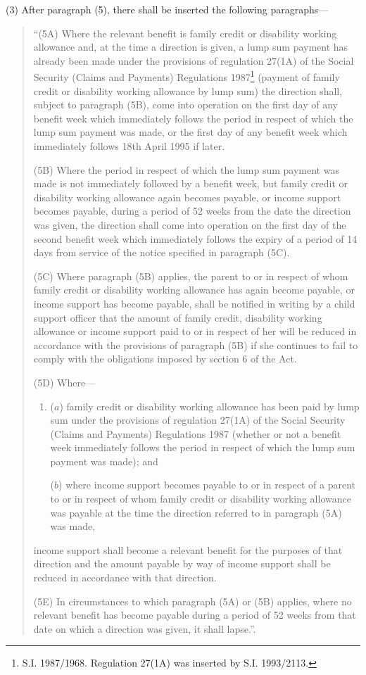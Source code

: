 \documentclass[a4paper]{article}
\begin{document}
(3) After paragraph (5), there shall be inserted the following paragraphs—
\begin{quotation}
“(5A) Where the relevant benefit is family credit or disability working allowance and, at the time a direction is given, a lump sum payment has already been made under the provisions of regulation 27(1A) of the Social Security (Claims and Payments) Regulations 1987\footnote{\frenchspacing S.I. 1987/1968. Regulation 27(1A) was inserted by S.I. 1993/2113.} (payment of family credit or disability working allowance by lump sum) the direction shall, subject to paragraph (5B), come into operation on the first day of any benefit week which immediately follows the period in respect of which the lump sum payment was made, or the first day of any benefit week which immediately follows 18th April 1995 if later.

(5B) Where the period in respect of which the lump sum payment was made is not immediately followed by a benefit week, but family credit or disability working allowance again becomes payable, or income support becomes payable, during a period of 52 weeks from the date the direction was given, the direction shall come into operation on the first day of the second benefit week which immediately follows the expiry of a period of 14 days from service of the notice specified in paragraph (5C).

(5C) Where paragraph (5B) applies, the parent to or in respect of whom family credit or disability working allowance has again become payable, or income support has become payable, shall be notified in writing by a child support officer that the amount of family credit, disability working allowance or income support paid to or in respect of her will be reduced in accordance with the provisions of paragraph (5B) if she continues to fail to comply with the obligations imposed by section 6 of the Act.

(5D) Where—
\begin{enumerate}\item[]
($a$) family credit or disability working allowance has been paid by lump sum under the provisions of regulation 27(1A) of the Social Security (Claims and Payments) Regulations 1987 (whether or not a benefit week immediately follows the period in respect of which the lump sum payment was made); and

($b$) where income support becomes payable to or in respect of a parent to or in respect of whom family credit or disability working allowance was payable at the time the direction referred to in paragraph (5A) was made, 
\end{enumerate}
income support shall become a relevant benefit for the purposes of that direction and the amount payable by way of income support shall be reduced in accordance with that direction.

(5E) In circumstances to which paragraph (5A) or (5B) applies, where no relevant benefit has become payable during a period of 52 weeks from that date on which a direction was given, it shall lapse.”.
\end{quotation}
\end{document}
